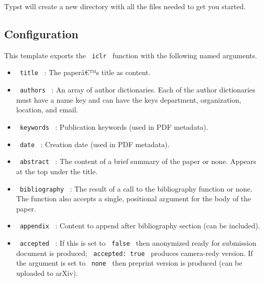 Typst will create a new directory with all the files needed to get you
started.

\subsection{Configuration}\label{configuration}

This template exports the \texttt{\ iclr\ } function with the following
named arguments.

\begin{itemize}
\item
  \texttt{\ title\ } : The paperâ€™s title as content.
\item
  \texttt{\ authors\ } : An array of author dictionaries. Each of the
  author dictionaries must have a name key and can have the keys
  department, organization, location, and email.

\begin{Shaded}
\begin{Highlighting}[]
\NormalTok{  (}
\NormalTok{  ),}
\NormalTok{)}
\end{Highlighting}
\end{Shaded}
\item
  \texttt{\ keywords\ } : Publication keywords (used in PDF metadata).
\item
  \texttt{\ date\ } : Creation date (used in PDF metadata).
\item
  \texttt{\ abstract\ } : The content of a brief summary of the paper or
  none. Appears at the top under the title.
\item
  \texttt{\ bibliography\ } : The result of a call to the bibliography
  function or none. The function also accepts a single, positional
  argument for the body of the paper.
\item
  \texttt{\ appendix\ } : Content to append after bibliography section
  (can be included).
\item
  \texttt{\ accepted\ } : If this is set to \texttt{\ false\ } then
  anonymized ready for submission document is produced;
  \texttt{\ accepted:\ true\ } produces camera-redy version. If the
  argument is set to \texttt{\ none\ } then preprint version is produced
  (can be uploaded to arXiv).
\end{itemize}

